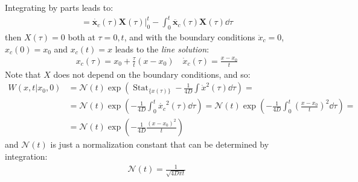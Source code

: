 \documentclass[../template.tex]{subfiles}
\begin{document}
Integrating by parts leads to:
\begin{align*}
    = \dot{\bm{x}_c}(\tau) \bm{X}(\tau) \Big|_0^t - \int_0^t \ddot{\bm{x}_c}(\tau) \bm{X}(\tau) \dd{\tau}
\end{align*}
then $X(\tau) = 0$ both at $\tau = 0,t$, and with the boundary conditions $\ddot{x}_c = 0$, $x_c(0) = x_0$ and $x_c(t) = x$ leads to the \textit{line solution}:
\begin{align*}
    x_c(\tau) = x_0 + \frac{\tau}{t}(x- x_0)   \quad \dot{x}_c(\tau) = \frac{x-x_0}{t} 
\end{align*}     
Note that $X$ does not depend on the boundary conditions, and so:
\begin{align*}
    W(x,t|x_0,0) &= \mathcal{N}(t) \exp\left(\operatorname{Stat}_{\{x(\tau)\}}  -\frac{1}{4D}\int \dot{x}^2 (\tau) \dd{\tau} \right) = \\
    &= \mathcal{N}(t) \exp\left(-\frac{1}{4D} \int_0^t \dot{x_c}^2 (\tau) \dd{\tau} \right) = \mathcal{N}(t) \exp\left(-\frac{1}{4D} \int_0^t \left(\frac{x-x_0 }{t} \right)^2 \dd{\tau}\right) = 
    \\
    &= \mathcal{N}(t) \exp\left(-\frac{1}{4D} \frac{(x-x_0)^2}{t}  \right)
\end{align*} 
and $\mathcal{N}(t)$ is just a normalization constant that can be determined by integration:
\begin{align*}
    \mathcal{N}(t) = \frac{1}{\sqrt{4 D \pi t}} 
\end{align*} 
\end{document}
